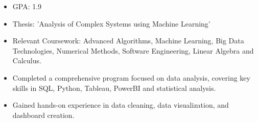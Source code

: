 \documentclass[9pt,a4paper,ragged2e,withhyper]{altacv}
\begin{document}
\begin{paracol}{2}
            \begin{itemize}
                \item GPA: 1.9
                \item Thesis: 'Analysis of Complex Systems using Machine Learning'
                \item Relevant Coursework: Advanced Algorithms, Machine Learning, Big Data Technologies, Numerical Methods, Software Engineering, Linear Algebra and Calculus.
            \end{itemize}
            \vspace{0.5em}
            \begin{itemize}
                \item Completed a comprehensive program focused on data analysis, covering key skills in SQL, Python, Tableau, PowerBI and statistical analysis.
                \item Gained hands-on experience in data cleaning, data visualization, and dashboard creation.
            \end{itemize}
            \vspace{0.5em}
        

\end{paracol}
\end{document}
